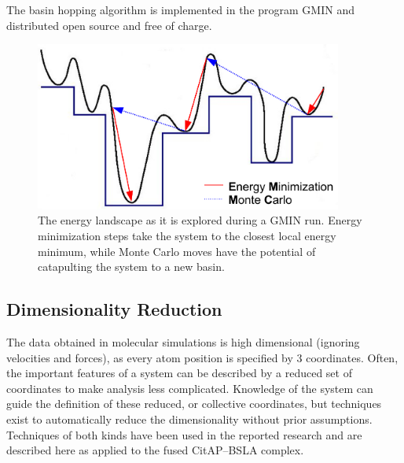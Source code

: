 \documentclass[english, a4paper, 12pt, titlepage, draft]{article}
\begin{document}
The basin hopping algorithm is implemented in the program GMIN \cite{GMIN} and distributed open source and free of charge.

\begin{figure}
    \centering
    \includegraphics[width=0.9\textwidth]{figures/GMIN/GMIN.pdf}
    \caption{The energy landscape as it is explored during a GMIN run. Energy minimization steps take the system to the closest local energy minimum, while Monte Carlo moves have the potential of catapulting the system to a new basin.}
    \label{fig:GMIN}
\end{figure}        




\subsection{Dimensionality Reduction}
\label{sec:DimRed}

The data obtained in molecular simulations is high dimensional (ignoring velocities and forces), as every atom position is specified by 3 coordinates.
Often, the important features of a system can be described by a reduced set of coordinates to make analysis less complicated.
Knowledge of the system can guide the definition of these reduced, or collective coordinates, but techniques exist to automatically reduce the dimensionality without prior assumptions.
Techniques of both kinds have been used in the reported research and are described here as applied to the fused CitAP--BSLA complex.
\end{document}
